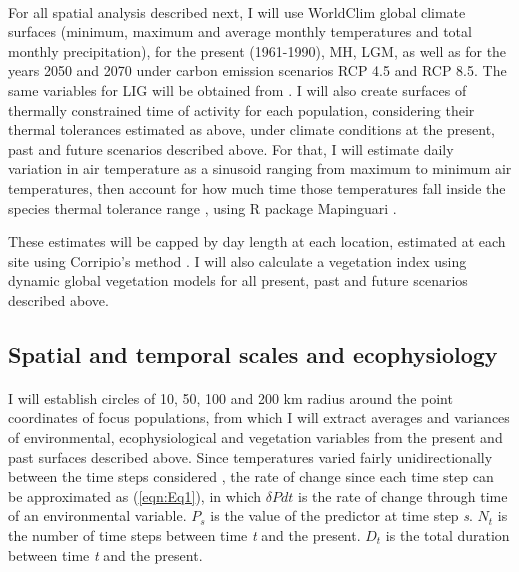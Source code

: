 \documentclass{article}
\begin{document}
{\paragraph{} For all spatial analysis described next, I will use WorldClim \cite{fick2017worldclim} global climate surfaces (minimum, maximum and average monthly temperatures and total monthly precipitation), for the present (1961-1990), MH, LGM, as well as for the years 2050 and 2070 under carbon emission scenarios RCP 4.5 and RCP 8.5. The same variables for LIG will be obtained from \cite{otto2006simulating}. I will also create surfaces of thermally constrained time of activity for each population, considering their thermal tolerances estimated as above, under climate conditions at the present, past and future scenarios described above. For that, I will estimate daily variation in air temperature as a sinusoid ranging from maximum to minimum air temperatures, then account for how much time those temperatures fall inside the species thermal tolerance range \cite{caetanotime, sinervo2010erosion}, using R package Mapinguari \cite{caetanotime}.
\begin{comment}
This is the simplest approach, which seems to work well. We also have operative temperature models and Kearney’s microclim surfaces. I have a paper in review in which I compare the three methods as distribution predictors for a lizard. Sinusoid was equivalent to microclim and much better than operative. Microclim would be ideal, but it is not available for the past or future. I think this could be improved by using the variation estimated in microclim to offset WorldClim past and future temperature projections, but this needs to be validated
\end{comment}
These estimates will be capped by day length at each location, estimated at each site using Corripio’s method \cite{corripio2003vectorial}. I will also calculate a vegetation index using dynamic global vegetation models \cite{sitch2008evaluation} for all present, past and future scenarios described above.

\subsection{Spatial and temporal scales and ecophysiology}

\paragraph{} I will establish circles of 10, 50, 100 and 200 km radius around the point coordinates of focus populations, from which I will extract averages and variances of environmental, ecophysiological and vegetation variables from the present and past surfaces described above. Since temperatures varied fairly unidirectionally between the time steps considered \cite{de2018late}, the rate of change since each time step can be approximated as (\ref{eqn:Eq1}), in which $\delta Pdt$ is the rate of change through time of an environmental variable. $P_{s}$ is the value of the predictor at time step \textit{s}. $N_{t}$ is the number of time steps between time \textit{t} and the present. $D_{t}$ is the total duration between time \textit{t} and the present. 

}
\end{document}
